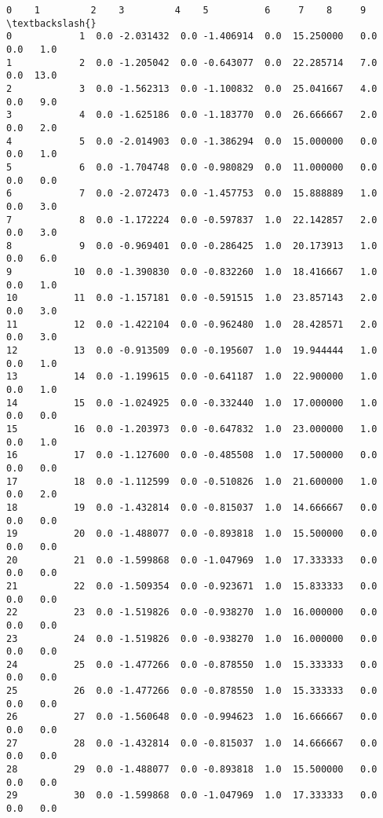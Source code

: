 \documentclass[11pt]{article}
\begin{document}
    \begin{Verbatim}[commandchars=\\\{\}]
            0    1         2    3         4    5          6     7    8     9   \textbackslash{}
0            1  0.0 -2.031432  0.0 -1.406914  0.0  15.250000   0.0  0.0   1.0   
1            2  0.0 -1.205042  0.0 -0.643077  0.0  22.285714   7.0  0.0  13.0   
2            3  0.0 -1.562313  0.0 -1.100832  0.0  25.041667   4.0  0.0   9.0   
3            4  0.0 -1.625186  0.0 -1.183770  0.0  26.666667   2.0  0.0   2.0   
4            5  0.0 -2.014903  0.0 -1.386294  0.0  15.000000   0.0  0.0   1.0   
5            6  0.0 -1.704748  0.0 -0.980829  0.0  11.000000   0.0  0.0   0.0   
6            7  0.0 -2.072473  0.0 -1.457753  0.0  15.888889   1.0  0.0   3.0   
7            8  0.0 -1.172224  0.0 -0.597837  1.0  22.142857   2.0  0.0   3.0   
8            9  0.0 -0.969401  0.0 -0.286425  1.0  20.173913   1.0  0.0   6.0   
9           10  0.0 -1.390830  0.0 -0.832260  1.0  18.416667   1.0  0.0   1.0   
10          11  0.0 -1.157181  0.0 -0.591515  1.0  23.857143   2.0  0.0   3.0   
11          12  0.0 -1.422104  0.0 -0.962480  1.0  28.428571   2.0  0.0   3.0   
12          13  0.0 -0.913509  0.0 -0.195607  1.0  19.944444   1.0  0.0   1.0   
13          14  0.0 -1.199615  0.0 -0.641187  1.0  22.900000   1.0  0.0   1.0   
14          15  0.0 -1.024925  0.0 -0.332440  1.0  17.000000   1.0  0.0   0.0   
15          16  0.0 -1.203973  0.0 -0.647832  1.0  23.000000   1.0  0.0   1.0   
16          17  0.0 -1.127600  0.0 -0.485508  1.0  17.500000   0.0  0.0   0.0   
17          18  0.0 -1.112599  0.0 -0.510826  1.0  21.600000   1.0  0.0   2.0   
18          19  0.0 -1.432814  0.0 -0.815037  1.0  14.666667   0.0  0.0   0.0   
19          20  0.0 -1.488077  0.0 -0.893818  1.0  15.500000   0.0  0.0   0.0   
20          21  0.0 -1.599868  0.0 -1.047969  1.0  17.333333   0.0  0.0   0.0   
21          22  0.0 -1.509354  0.0 -0.923671  1.0  15.833333   0.0  0.0   0.0   
22          23  0.0 -1.519826  0.0 -0.938270  1.0  16.000000   0.0  0.0   0.0   
23          24  0.0 -1.519826  0.0 -0.938270  1.0  16.000000   0.0  0.0   0.0   
24          25  0.0 -1.477266  0.0 -0.878550  1.0  15.333333   0.0  0.0   0.0   
25          26  0.0 -1.477266  0.0 -0.878550  1.0  15.333333   0.0  0.0   0.0   
26          27  0.0 -1.560648  0.0 -0.994623  1.0  16.666667   0.0  0.0   0.0   
27          28  0.0 -1.432814  0.0 -0.815037  1.0  14.666667   0.0  0.0   0.0   
28          29  0.0 -1.488077  0.0 -0.893818  1.0  15.500000   0.0  0.0   0.0   
29          30  0.0 -1.599868  0.0 -1.047969  1.0  17.333333   0.0  0.0   0.0   

\end{Verbatim}
\end{document}

